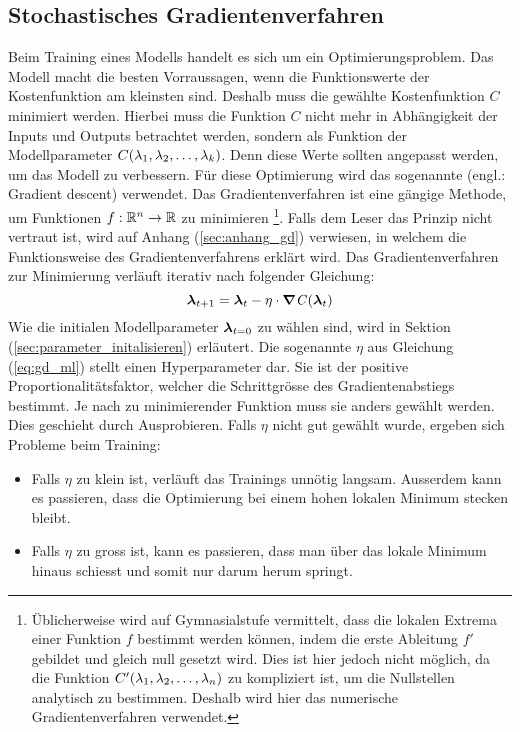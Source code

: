 \subsection{Stochastisches Gradientenverfahren}\label{sec:gradientenverfahren}
Beim Training eines Modells handelt es sich um ein Optimierungsproblem.
Das Modell macht die besten Vorraussagen, wenn die
Funktionswerte der Kostenfunktion am kleinsten sind.
Deshalb muss die gewählte Kostenfunktion $C$ minimiert werden.
Hierbei muss die Funktion $C$ nicht mehr in Abhängigkeit der Inputs und Outputs betrachtet
werden, sondern als Funktion der Modellparameter
$C(\lambda_1, \lambda_2, \ldots, \lambda_k)$. Denn diese Werte sollten angepasst
werden, um das Modell zu verbessern.
\para{}
Für diese Optimierung wird das sogenannte  (engl.: Gradient descent) verwendet.
Das Gradientenverfahren ist eine gängige Methode, um Funktionen $f: \mathbb{R}^n \to
\mathbb{R}$ zu minimieren
\footnote{Üblicherweise wird auf Gymnasialstufe vermittelt, dass die lokalen
  Extrema einer Funktion $f$ bestimmt werden
  können, indem die erste Ableitung $f'$ gebildet und gleich null gesetzt
  wird. Dies ist hier jedoch nicht möglich, da die Funktion
  $C'(\lambda_1,\lambda_2,\ldots,\lambda_n)$ zu kompliziert ist, um die
  Nullstellen analytisch zu bestimmen. Deshalb wird hier das numerische Gradientenverfahren
  verwendet.
}.
Falls dem Leser das Prinzip nicht vertraut ist, wird auf Anhang
(\ref{sec:anhang_gd}) verwiesen, in
welchem die Funktionsweise des Gradientenverfahrens erklärt wird.
\para{}
Das Gradientenverfahren zur Minimierung verläuft iterativ nach folgender
Gleichung:
\begin{equation}\label{eq:gd_ml}
  \bm{\lambda}_{t+1} = \bm{\lambda}_t - \eta \cdot \bm{\nabla} \mathit{C}(\bm{\lambda}_t)
\end{equation}
Wie die initialen Modellparameter $\bm{\lambda}_{t=0}$ zu wählen sind, wird in Sektion
(\ref{sec:parameter_initalisieren}) erläutert.
\para{}
Die sogenannte  $\eta$ aus Gleichung (\ref{eq:gd_ml}) stellt
einen Hyperparameter dar. Sie ist der positive Proportionalitätsfaktor, welcher die Schrittgrösse des
Gradientenabstiegs bestimmt.
Je nach zu minimierender Funktion muss sie anders gewählt werden.
Dies geschieht durch Ausprobieren. Falls $\eta$ nicht gut gewählt wurde, ergeben
sich Probleme beim Training:
\begin{itemize}
\item{Falls $\eta$ zu klein ist, verläuft das Trainings unnötig langsam.
    Ausserdem kann es passieren, dass die Optimierung bei einem hohen lokalen Minimum stecken bleibt.}

\item{Falls $\eta$ zu gross ist, kann es passieren, dass man über das lokale
    Minimum hinaus schiesst und somit nur darum herum springt.}
\end{itemize}

